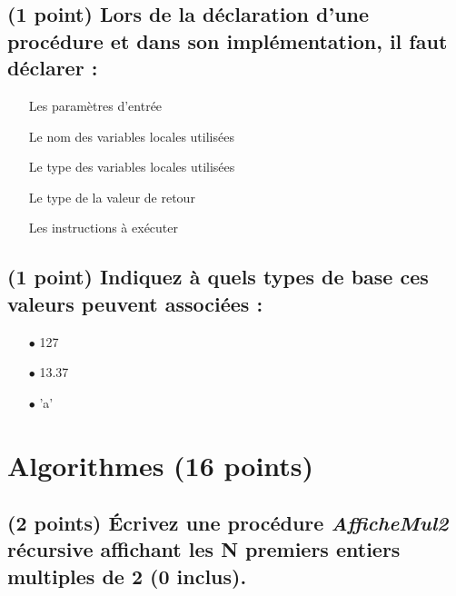 \documentclass[11pt,a4paper]{article}
\begin{document}
\bigskip

\subsection{(1 point) Lors de la déclaration d'une procédure et dans son implémentation, il faut déclarer : }

\bigskip

\begin{itemize}
  \item[\CaseCoche] Les paramètres d'entrée   \phantom{(}
  \item[\CaseCoche] Le nom des variables locales utilisées   \phantom{(}
  \item[\CaseCoche] Le type des variables locales utilisées   \phantom{(}
  \item[\CaseCoche] Le type de la valeur de retour   \phantom{(}
  \item[\CaseCoche] Les instructions à exécuter   \phantom{(}
\end{itemize}

\bigskip

\subsection{(1 point) Indiquez à quels types de base ces valeurs peuvent associées : }

\bigskip

\begin{itemize}
  \item[$\bullet$] 127     \phantom{(} \\
  \item[$\bullet$] 13.37   \phantom{(} \\
  \item[$\bullet$] 'a'     \phantom{(} \\
\end{itemize}

\vfillLast

\newpage


\section{Algorithmes (16 points)}

\subsection{(2 points) \'Ecrivez une procédure \og \textit{AfficheMul2} \fg{} récursive affichant les N premiers entiers multiples de 2 (0 inclus). }
\end{document}
